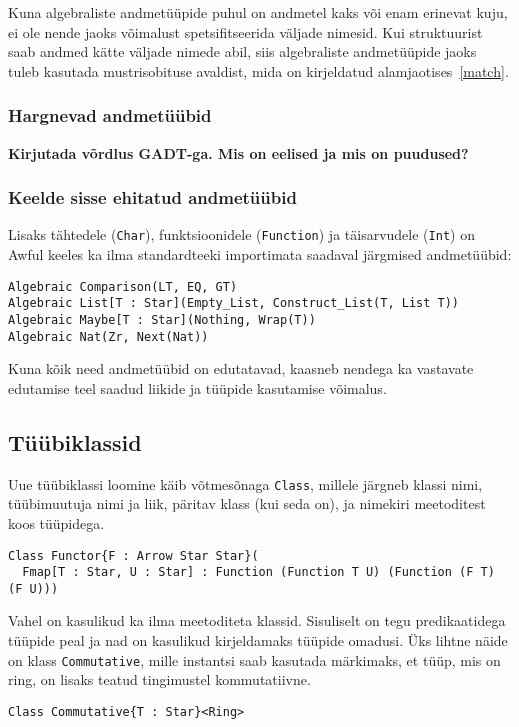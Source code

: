 \documentclass[12pt]{article}
\newcommand\markus[1]{\textcolor{roheline}{\textbf{#1}}}
\begin{document}
        Kuna algebraliste andmetüüpide puhul on andmetel kaks või enam erinevat kuju, ei ole nende jaoks võimalust spetsifitseerida väljade nimesid. Kui struktuurist saab andmed kätte väljade nimede abil, siis algebraliste andmetüüpide jaoks tuleb kasutada mustrisobituse avaldist, mida on kirjeldatud alamjaotises~\ref{match}.
      \subsubsection{Hargnevad andmetüübid}
        \markus{Kirjutada võrdlus GADT-ga. Mis on eelised ja mis on puudused?}
      \subsubsection{Keelde sisse ehitatud andmetüübid}\label{sisseehitatudalgebralised}
        Lisaks tähtedele (\verb!Char!), funktsioonidele (\verb!Function!) ja täisarvudele (\verb!Int!) on Awful keeles ka ilma standardteeki importimata saadaval järgmised andmetüübid:

        \begin{verbatim}Algebraic Comparison(LT, EQ, GT)
Algebraic List[T : Star](Empty_List, Construct_List(T, List T))
Algebraic Maybe[T : Star](Nothing, Wrap(T))
Algebraic Nat(Zr, Next(Nat))\end{verbatim}

        Kuna kõik need andmetüübid on edutatavad, kaasneb nendega ka vastavate edutamise teel saadud liikide ja tüüpide kasutamise võimalus.
    \subsection{Tüübiklassid}
      Uue tüübiklassi loomine käib võtmesõnaga \verb!Class!, millele järgneb klassi nimi, tüübimuutuja nimi ja liik, päritav klass (kui seda on), ja nimekiri meetoditest koos tüüpidega.

      \begin{verbatim}Class Functor{F : Arrow Star Star}(
  Fmap[T : Star, U : Star] : Function (Function T U) (Function (F T) (F U)))\end{verbatim}

      Vahel on kasulikud ka ilma meetoditeta klassid. Sisuliselt on tegu predikaatidega tüüpide peal ja nad on kasulikud kirjeldamaks tüüpide omadusi. Üks lihtne näide on klass \verb!Commutative!, mille instantsi saab kasutada märkimaks, et tüüp, mis on ring, on lisaks teatud tingimustel kommutatiivne.

      \begin{verbatim}Class Commutative{T : Star}<Ring>\end{verbatim}
\end{document}
